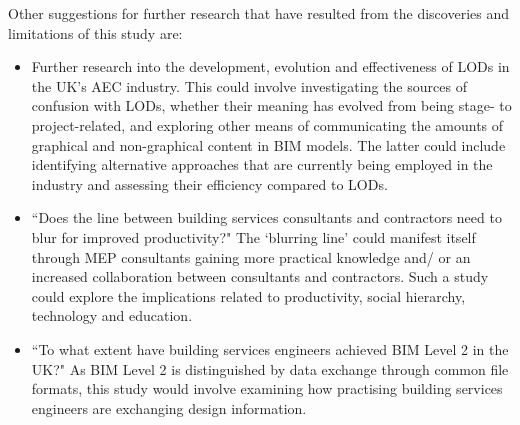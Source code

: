 Other suggestions for further research that have resulted from the discoveries and limitations of this study are:
\begin{itemize}
	\item Further research into the development, evolution and effectiveness of LODs in the UK's AEC industry.
	This could involve investigating the sources of confusion with LODs, whether their meaning has evolved from being stage- to project-related, and exploring other means of communicating the amounts of graphical and non-graphical content in BIM models.
	The latter could include identifying alternative approaches that are currently being employed in the industry and assessing their efficiency compared to LODs.
	
	\item ``Does the line between building services consultants and contractors need to blur for improved productivity?" The `blurring line' could manifest itself through MEP consultants gaining more practical knowledge and/ or an increased collaboration between consultants and contractors.
	Such a study could explore the implications related to productivity, social hierarchy, technology and education.
	
	\item ``To what extent have building services engineers achieved BIM Level 2 in the UK?" As BIM Level 2 is distinguished by data exchange through common file formats, this study would involve examining how practising building services engineers are exchanging design information.
\end{itemize}




\begin{comment}
TEST: if/ when the technology emerges to make intelligent object substitutions in BIM models, compare the
(1) productivity of construction projects/ 
(2) efficiency of handover (e.g. compare number of hours worked)/ 
(3) how well the contractor works on site in the following scenarios:
\begin{itemize}
	\item The contractor simply substitutes the generic BIM objects with specific ones without doing any form of re-work
	\item The contractor re-builds the model (like they do today), learning the design intimately
\end{itemize}
\end{comment}

